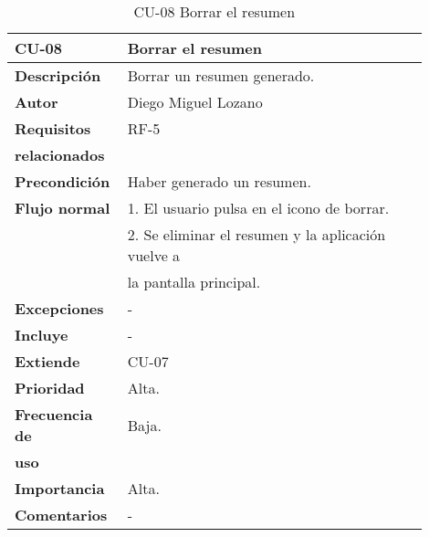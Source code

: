 \begin{longtable}{>{\raggedright}b{0.2\linewidth}>{\raggedright\arraybackslash}b{0.7\linewidth}}
	\toprule
	\textbf{CU-08} & \textbf{Borrar el resumen} \\
	\toprule
	\endhead
	
	\toprule
	\caption{CU-08 Borrar el resumen}
	\endfoot
	
	\small{\textbf{Descripción}} & Borrar un resumen generado. \\
	\small{\textbf{Autor}} & Diego Miguel Lozano \\
	\small{\textbf{Requisitos}} & RF-5  \\
	\small{\textbf{relacionados}} & \\
	\small{\textbf{Precondición}} & Haber generado un resumen. \\
	\small{\textbf{Flujo normal}} & \quad \small{1. El usuario pulsa en el icono de borrar.} \\
	 & \quad \small{2. Se eliminar el resumen y la aplicación vuelve a} \\
	 & \qquad \small{la pantalla principal.} \\
	\small{\textbf{Excepciones}} & - \\
	\small{\textbf{Incluye}} & - \\
	\small{\textbf{Extiende}} & CU-07 \\
	\small{\textbf{Prioridad}} & Alta. \\
	\small{\textbf{Frecuencia de}} & Baja. \\
	\small{\textbf{uso}} & \\
	\small{\textbf{Importancia}} & Alta. \\
	\small{\textbf{Comentarios}} & - \\
\end{longtable}
